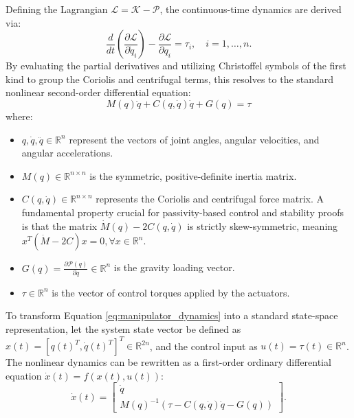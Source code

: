 Defining the Lagrangian $\mathcal{L} = \mathcal{K} - \mathcal{P}$, the continuous-time dynamics are derived via:
\begin{equation}
    \frac{d}{dt} \left( \frac{\partial \mathcal{L}}{\partial \dot{q}_i} \right) - \frac{\partial \mathcal{L}}{\partial q_i} = \tau_i, \quad i = 1, \dots, n.
\end{equation}
By evaluating the partial derivatives and utilizing Christoffel symbols of the first kind to group the Coriolis and centrifugal terms, this resolves to the standard nonlinear second-order differential equation:
\begin{equation} \label{eq:manipulator_dynamics}
    M(q)\ddot{q} + C(q,\dot{q})\dot{q} + G(q) = \tau
\end{equation}
where:
\begin{itemize}
    \item $q, \dot{q}, \ddot{q} \in \mathbb{R}^n$ represent the vectors of joint angles, angular velocities, and angular accelerations.
    \item $M(q) \in \mathbb{R}^{n \times n}$ is the symmetric, positive-definite inertia matrix.
    \item $C(q, \dot{q}) \in \mathbb{R}^{n \times n}$ represents the Coriolis and centrifugal force matrix. A fundamental property crucial for passivity-based control and stability proofs is that the matrix $\dot{M}(q) - 2C(q, \dot{q})$ is strictly skew-symmetric, meaning $x^T (\dot{M} - 2C) x = 0, \forall x \in \mathbb{R}^n$.
    \item $G(q) = \frac{\partial \mathcal{P}(q)}{\partial q} \in \mathbb{R}^n$ is the gravity loading vector.
    \item $\tau \in \mathbb{R}^n$ is the vector of control torques applied by the actuators.
\end{itemize}

To transform Equation \ref{eq:manipulator_dynamics} into a standard state-space representation, let the system state vector be defined as $x(t) = [q(t)^T, \dot{q}(t)^T]^T \in \mathbb{R}^{2n}$, and the control input as $u(t) = \tau(t) \in \mathbb{R}^n$. The nonlinear dynamics can be rewritten as a first-order ordinary differential equation $\dot{x}(t) = f(x(t), u(t))$:
\begin{equation}
    \dot{x}(t) = \begin{bmatrix} \dot{q} \\ M(q)^{-1}(\tau - C(q,\dot{q})\dot{q} - G(q)) \end{bmatrix}.
\end{equation}

